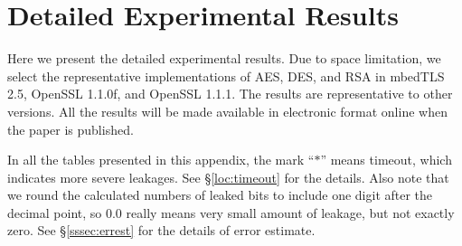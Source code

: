 \section{Detailed Experimental Results}
\label{sec:result-table}

Here we present the detailed experimental results.
Due to space limitation, we select the representative implementations of
AES, DES, and RSA in
mbedTLS 2.5,
OpenSSL 1.1.0f,  and
OpenSSL 1.1.1.  
The results are representative to other versions.
All the results will be made available in electronic format online
when the paper is published. %

In all the tables presented in this appendix, the mark ``$*$'' means timeout,
which indicates more severe leakages. See \S\ref{loc:timeout} for the details.
Also note that we round the calculated numbers of leaked bits to include one digit
after the decimal point, so $0.0$ really means very small amount of leakage, 
but not exactly zero. See \S\ref{sssec:errest} for the details of error estimate.

 
 
 
 
 
 
 
 
 
 
 
 
 

